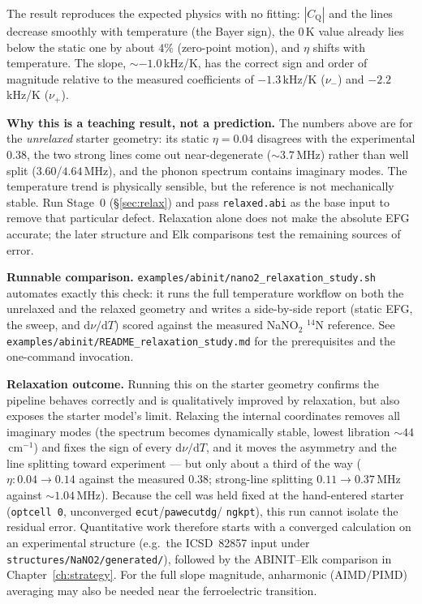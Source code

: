\documentclass[11pt,oneside]{report}
\newcommand{\code}[1]{{\small\nolinkurl{#1}}}
\newcommand{\cmd}[1]{\texttt{\small #1}}
\newcommand{\Cq}{C_{\mathrm{Q}}}
\begin{document}
The result reproduces the expected physics with no fitting: $|\Cq|$ and the lines
decrease smoothly with temperature (the Bayer sign), the $0$\,K value already lies
below the static one by about $4\%$ (zero-point motion), and $\eta$ shifts with
temperature. The slope, $\sim -1.0$\,kHz/K, has the correct sign and order of
magnitude relative to the measured coefficients of $-1.3$\,kHz/K ($\nu_-$) and
$-2.2$\,kHz/K ($\nu_+$).

\textbf{Why this is a teaching result, not a prediction.} The numbers above are
for the \emph{unrelaxed} starter geometry:
its static $\eta = 0.04$ disagrees with the experimental $0.38$, the two strong
lines come out near-degenerate ($\sim 3.7$\,MHz) rather than well split
($3.60$/$4.64$\,MHz), and the phonon spectrum contains imaginary modes. The
temperature trend is physically sensible, but the reference is not mechanically
stable. Run Stage~0 (\S\ref{sec:relax}) and pass \code{relaxed.abi} as the base
input to remove that particular defect. Relaxation alone does not make the
absolute EFG accurate; the later structure and Elk comparisons test the
remaining sources of error.

\textbf{Runnable comparison.} \code{examples/abinit/nano2\_relaxation\_study.sh}
automates exactly this check: it runs the full temperature workflow on both the
unrelaxed and the relaxed geometry and writes a side-by-side report (static EFG,
the sweep, and $\mathrm d\nu/\mathrm dT$) scored against the measured NaNO$_2$
$^{14}$N reference. See \code{examples/abinit/README\_relaxation\_study.md} for
the prerequisites and the one-command invocation.

\textbf{Relaxation outcome.} Running this on the starter geometry confirms the
pipeline behaves correctly and is qualitatively improved by relaxation, but also
exposes the starter model's limit. Relaxing the internal coordinates removes all imaginary
modes (the spectrum becomes dynamically stable, lowest libration $\sim 44$\,cm$^{-1}$)
and fixes the sign of every $\mathrm d\nu/\mathrm dT$, and it moves the asymmetry
and the line splitting toward experiment --- but only about a third of the way
($\eta: 0.04 \to 0.14$ against the measured $0.38$; strong-line splitting
$0.11 \to 0.37$\,MHz against $\sim 1.04$\,MHz). Because the cell was held fixed at
the hand-entered starter (\cmd{optcell 0}, unconverged \code{ecut}/\code{pawecutdg}/
\code{ngkpt}), this run cannot isolate the residual error. Quantitative work
therefore starts with a converged calculation
on an experimental structure (e.g.\ the ICSD~82857 input under
\code{structures/NaNO2/generated/}), followed by the ABINIT--Elk comparison in
Chapter~\ref{ch:strategy}. For the full slope magnitude, anharmonic (AIMD/PIMD)
averaging may also be needed near the ferroelectric transition.
\end{document}
